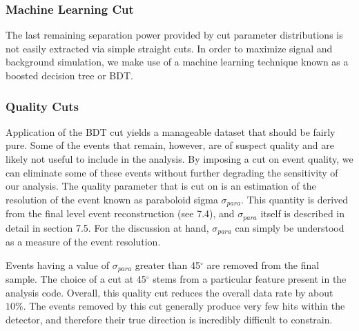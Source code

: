 \documentclass{gatech-thesis}
\begin{document}
\subsubsection{Machine Learning Cut}
The last remaining separation power provided by cut parameter distributions is not easily extracted via simple straight cuts. In order to maximize signal and background simulation, we make use of a machine learning technique known as a boosted decision tree or BDT. 

\cite{MachineLearning}

\subsubsection{Quality Cuts}
Application of the BDT cut yields a manageable dataset that should be fairly pure. Some of the events that remain, however, are of suspect quality and are likely not useful to include in the analysis. By imposing a cut on event quality, we can eliminate some of these events without further degrading the sensitivity of our analysis. The quality parameter that is cut on is an estimation of the resolution of the event known as paraboloid sigma $\sigma_{para}$. This quantity is derived from the final level event reconstruction (see 7.4), and $\sigma_{para}$ itself is described in detail in section 7.5. For the discussion at hand, $\sigma_{para}$ can simply be understood as a measure of the event resolution.

Events having a value of $\sigma_{para}$ greater than 45$^{\circ}$ are removed from the final sample. The choice of a cut at 45$^{\circ}$ stems from a particular feature present in the analysis code. Overall, this quality cut reduces the overall data rate by about $10\%$. The events removed by this cut generally produce very few hits within the detector, and therefore their true direction is incredibly difficult to constrain.
\end{document}

